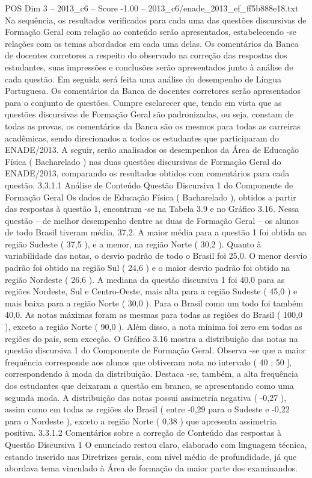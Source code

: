 \begin{textsample}{POS Dim 3 – 2013\_c6 – Score -1.00 – 2013\_c6/enade\_2013\_ef\_ff5b888e18.txt}
Na sequência, os resultados verificados para cada uma das questões discursivas de Formação Geral com relação ao conteúdo serão apresentados, estabelecendo -se relações com os temas abordados em cada uma delas.
Os comentários da Banca de docentes corretores a respeito do observado na correção das respostas dos estudantes, suas impressões e conclusões serão apresentados junto à análise de cada questão.
Em seguida será feita uma análise do desempenho de Língua Portuguesa.
Os comentários da Banca de docentes corretores serão apresentados para o conjunto de questões.
Cumpre esclarecer que, tendo em vista que as questões discursivas de Formação Geral são padronizadas, ou seja, constam de todas as provas, os comentários da Banca são os mesmos para todas as carreiras acadêmicas, sendo direcionados a todos os estudantes que participaram do ENADE/2013.
A seguir, serão analisados os desempenhos da Área de Educação Física ( Bacharelado ) nas duas questões discursivas de Formação Geral do ENADE/2013, comparando os resultados obtidos com comentários para cada questão. 3.3.1.1 Análise de Conteúdo Questão Discursiva 1 do Componente de Formação Geral Os dados de Educação Física ( Bacharelado ), obtidos a partir das respostas à questão 1, encontram -se na Tabela 3.9 e no Gráfico 3.16.
Nessa questão – de melhor desempenho dentre as duas de Formação Geral – os alunos de todo Brasil tiveram média, 37,2.
A maior média para a questão 1 foi obtida na região Sudeste ( 37,5 ), e a menor, na região Norte ( 30,2 ).
Quanto à variabilidade das notas, o desvio padrão de todo o Brasil foi 25,0.
O menor desvio padrão foi obtido na região Sul ( 24,6 ) e o maior desvio padrão foi obtido na região Nordeste ( 26,6 ).
A mediana da questão discursiva 1 foi 40,0 para as regiões Nordeste, Sul e Centro-Oeste, mais alta para a região Sudeste ( 45,0 ) e mais baixa para a região Norte ( 30,0 ).
Para o Brasil como um todo foi também 40,0.
As notas máximas foram as mesmas para todas as regiões do Brasil ( 100,0 ), exceto a região Norte ( 90,0 ).
Além disso, a nota mínima foi zero em todas as regiões do país, sem exceção.
O Gráfico 3.16 mostra a distribuição das notas na questão discursiva 1 do Componente de Formação Geral.
Observa -se que a maior frequência corresponde aos alunos que obtiveram nota no intervalo ( 40 ; 50 ], correspondendo à moda da distribuição.
Destaca -se, também, a alta frequência dos estudantes que deixaram a questão em branco, se apresentando como uma segunda moda.
A distribuição das notas possui assimetria negativa ( -0,27 ), assim como em todas as regiões do Brasil ( entre -0,29 para o Sudeste e -0,22 para o Nordeste ), exceto a região Norte ( 0,38 ) que apresenta assimetria positiva. 3.3.1.2 Comentários sobre a correção de Conteúdo das respostas à Questão Discursiva 1 O enunciado restou claro, elaborado com linguagem técnica, estando inserido nas Diretrizes gerais, com nível médio de profundidade, já que abordava tema vinculado à Área de formação da maior parte dos examinandos.

\end{textsample}
